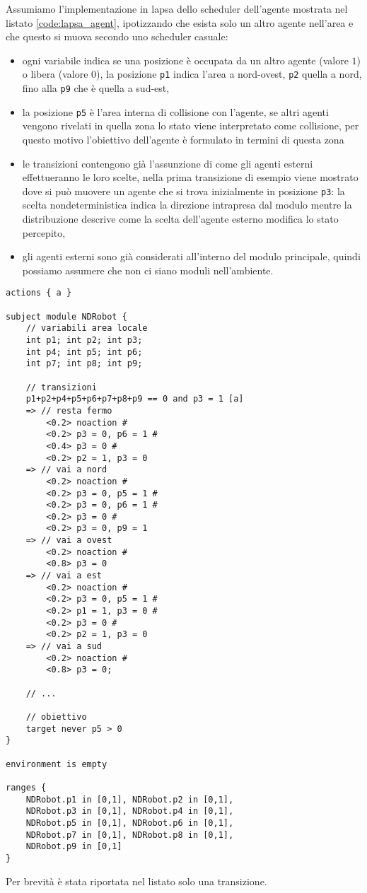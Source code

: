 Assumiamo l'implementazione in \ac{lapsa} dello scheduler dell'agente mostrata nel listato \ref{code:lapsa_agent}, ipotizzando che esista solo un altro agente nell'area e che questo si muova secondo uno scheduler casuale:
\begin{itemize}
	\item ogni variabile indica se una posizione è occupata da un altro agente (valore $1$) o libera (valore $0$), la posizione \texttt{p1} indica l'area a nord-ovest, \texttt{p2} quella a nord, fino alla \texttt{p9} che è quella a sud-est,
	\item la posizione \texttt{p5} è l'area interna di collisione con l'agente, se altri agenti vengono rivelati in quella zona lo stato viene interpretato come collisione, per questo motivo l'obiettivo dell'agente è formulato in termini di questa zona
	\item le transizioni contengono già l'assunzione di come gli agenti esterni effettueranno le loro scelte, nella prima transizione di esempio viene mostrato dove si può muovere un agente che si trova inizialmente in posizione \texttt{p3}: la scelta nondeterministica indica la direzione intrapresa dal modulo mentre la distribuzione descrive come la scelta dell'agente esterno modifica lo stato percepito,
	\item gli agenti esterni sono già considerati all'interno del modulo principale, quindi possiamo assumere che non ci siano moduli nell'ambiente.
\end{itemize}
\begin{lstlisting}[language=lapsa,style=eclipse,caption={Implementazione \ac{lapsa} dello scheduler basato su model-checking},label=code:lapsa_agent]
actions { a }

subject module NDRobot {
	// variabili area locale
	int p1; int p2; int p3;
	int p4; int p5; int p6;
	int p7; int p8; int p9;
	
	// transizioni
	p1+p2+p4+p5+p6+p7+p8+p9 == 0 and p3 = 1 [a]
	=> // resta fermo
		<0.2> noaction #
		<0.2> p3 = 0, p6 = 1 #
		<0.4> p3 = 0 #
		<0.2> p2 = 1, p3 = 0
	=> // vai a nord
		<0.2> noaction #
		<0.2> p3 = 0, p5 = 1 #
		<0.2> p3 = 0, p6 = 1 #
		<0.2> p3 = 0 #
		<0.2> p3 = 0, p9 = 1
	=> // vai a ovest
		<0.2> noaction #
		<0.8> p3 = 0
	=> // vai a est
		<0.2> noaction #
		<0.2> p3 = 0, p5 = 1 #
		<0.2> p1 = 1, p3 = 0 #
		<0.2> p3 = 0 #
		<0.2> p2 = 1, p3 = 0
	=> // vai a sud
		<0.2> noaction #
		<0.8> p3 = 0;

	// ...
	
	// obiettivo
	target never p5 > 0
}

environment is empty

ranges {
	NDRobot.p1 in [0,1], NDRobot.p2 in [0,1],
	NDRobot.p3 in [0,1], NDRobot.p4 in [0,1],
	NDRobot.p5 in [0,1], NDRobot.p6 in [0,1],
	NDRobot.p7 in [0,1], NDRobot.p8 in [0,1],
	NDRobot.p9 in [0,1]
}
\end{lstlisting}
Per brevità è stata riportata nel listato solo una transizione. 

